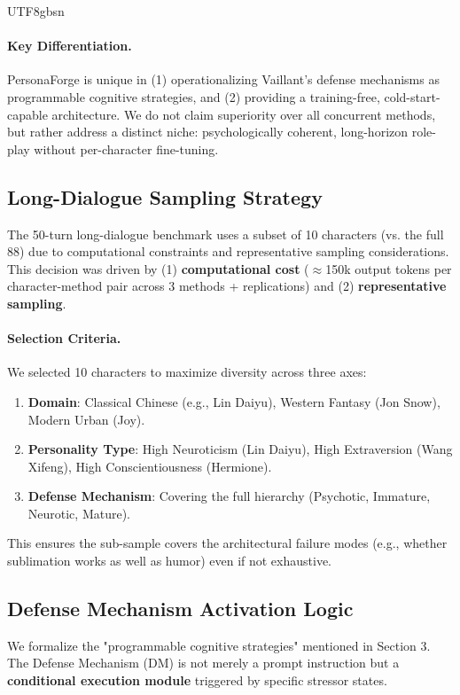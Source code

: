 \documentclass[11pt]{article}
\begin{document}
\begin{CJK*}{UTF8}{gbsn}
\paragraph{Key Differentiation.} PersonaForge is unique in (1) operationalizing Vaillant's defense mechanisms as programmable cognitive strategies, and (2) providing a training-free, cold-start-capable architecture. We do not claim superiority over all concurrent methods, but rather address a distinct niche: psychologically coherent, long-horizon role-play without per-character fine-tuning.

\subsection{Long-Dialogue Sampling Strategy}
\label{sec:long_dialogue_sampling}

The 50-turn long-dialogue benchmark uses a subset of 10 characters (vs. the full 88) due to computational constraints and representative sampling considerations. This decision was driven by (1) \textbf{computational cost} ($\approx$150k output tokens per character-method pair across 3 methods + replications) and (2) \textbf{representative sampling}.

\paragraph{Selection Criteria.} We selected 10 characters to maximize diversity across three axes:
\begin{enumerate}
    \item \textbf{Domain}: Classical Chinese (e.g., Lin Daiyu), Western Fantasy (Jon Snow), Modern Urban (Joy).
    \item \textbf{Personality Type}: High Neuroticism (Lin Daiyu), High Extraversion (Wang Xifeng), High Conscientiousness (Hermione).
    \item \textbf{Defense Mechanism}: Covering the full hierarchy (Psychotic, Immature, Neurotic, Mature).
\end{enumerate}
This ensures the sub-sample covers the architectural failure modes (e.g., whether sublimation works as well as humor) even if not exhaustive.

\subsection{Defense Mechanism Activation Logic}
\label{sec:dm_logic}

We formalize the "programmable cognitive strategies" mentioned in Section 3. The Defense Mechanism (DM) is not merely a prompt instruction but a \textbf{conditional execution module} triggered by specific stressor states.


\end{CJK*}
\end{document}
